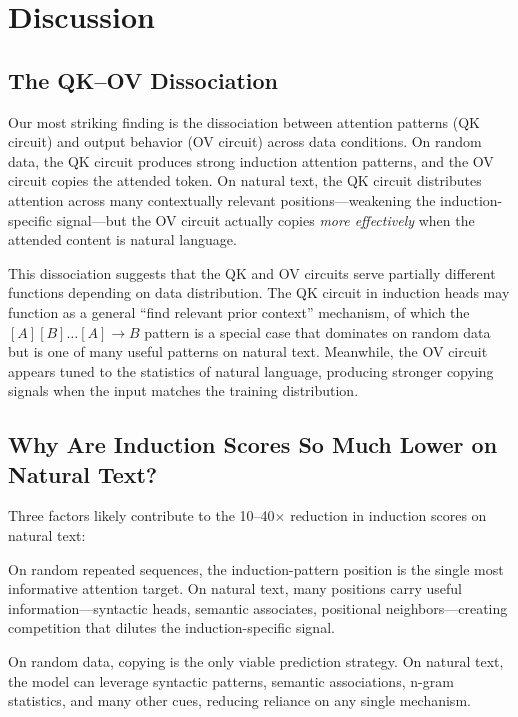 \section{Discussion}
\label{sec:discussion}

\subsection{The QK--OV Dissociation}
\label{sec:discussion_dissociation}

Our most striking finding is the dissociation between attention patterns (QK circuit) and output behavior (OV circuit) across data conditions.
On random data, the QK circuit produces strong induction attention patterns, and the OV circuit copies the attended token.
On natural text, the QK circuit distributes attention across many contextually relevant positions---weakening the induction-specific signal---but the OV circuit actually copies \emph{more effectively} when the attended content is natural language.

This dissociation suggests that the QK and OV circuits serve partially different functions depending on data distribution.
The QK circuit in induction heads may function as a general ``find relevant prior context'' mechanism, of which the $[A][B]\ldots[A] \rightarrow B$ pattern is a special case that dominates on random data but is one of many useful patterns on natural text.
Meanwhile, the OV circuit appears tuned to the statistics of natural language, producing stronger copying signals when the input matches the training distribution.

\subsection{Why Are Induction Scores So Much Lower on Natural Text?}
\label{sec:discussion_why}

Three factors likely contribute to the 10--40$\times$ reduction in induction scores on natural text:

On random repeated sequences, the induction-pattern position is the single most informative attention target.
On natural text, many positions carry useful information---syntactic heads, semantic associates, positional neighbors---creating competition that dilutes the induction-specific signal.

On random data, copying is the only viable prediction strategy.
On natural text, the model can leverage syntactic patterns, semantic associations, n-gram statistics, and many other cues, reducing reliance on any single mechanism.

